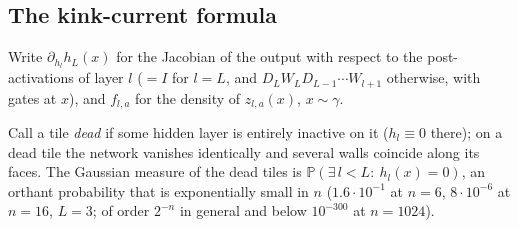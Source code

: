 \label{sec:current}
\subsection{The kink-current formula}
Write $\partial_{h_l}h_L(x)$ for the Jacobian of the output with respect to the post-activations of layer $l$
($=I$ for $l=L$, and $D_LW_LD_{L-1}\cdots W_{l+1}$ otherwise, with gates at $x$), and $f_{l,a}$ for the density of
$z_{l,a}(x)$, $x\sim\gamma$.

Call a tile \emph{dead} if some hidden layer is entirely inactive on it ($h_l\equiv0$ there); on a dead tile the network
vanishes identically and several walls coincide along its faces. The Gaussian measure of the dead tiles is
$\mathbb P(\exists\,l<L:\ h_l(x)=0)$, an orthant probability that is exponentially small in $n$ ($1.6\cdot10^{-1}$ at
$n=6$, $8\cdot10^{-6}$ at $n=16$, $L=3$; of order $2^{-n}$ in general and below $10^{-300}$ at $n=1024$).

